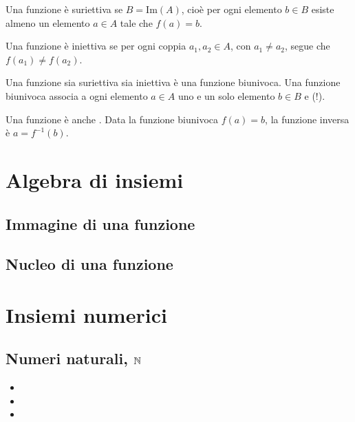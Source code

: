 \documentclass[letterpaper,10pt,italian]{jupyterBook}
\begin{document}
\sphinxAtStartPar
{} Una funzione è suriettiva se \(B = \text{Im}(A)\), cioè per ogni elemento \(b \in B\) esiste almeno un elemento \(a \in A\) tale che \(f(a) = b\).

\sphinxAtStartPar
{} Una funzione è iniettiva se per ogni coppia \(a_1, a_2 \in A\), con \(a_1 \ne a_2\), segue che \(f(a_1) \ne f(a_2)\).

\sphinxAtStartPar
{} Una funzione sia suriettiva sia iniettiva è una funzione biunivoca. Una funzione biunivoca associa a ogni elemento \(a \in A\) uno e un solo elemento \(b \in B\) e (!).

\sphinxAtStartPar
Una funzione  è anche . Data la funzione biunivoca \(f(a) = b\), la funzione inversa è \(a = f^{-1}(b)\).


\section{Algebra di insiemi}
\label{\detokenize{ch/set:algebra-di-insiemi}}\label{\detokenize{ch/set:math-hs-set-algebra}}

\subsection{Immagine di una funzione}
\label{\detokenize{ch/set:immagine-di-una-funzione}}\label{\detokenize{ch/set:math-hs-fun-range}}

\subsection{Nucleo di una funzione}
\label{\detokenize{ch/set:nucleo-di-una-funzione}}\label{\detokenize{ch/set:math-hs-fun-null}}

\section{Insiemi numerici}
\label{\detokenize{ch/set:insiemi-numerici}}\label{\detokenize{ch/set:math-hs-set-numbers}}

\subsection{Numeri naturali, \protect\(\mathbb{N}\protect\)}
\label{\detokenize{ch/set:numeri-naturali-mathbb-n}}\label{\detokenize{ch/set:math-hs-set-numbers-n}}\begin{itemize}
\item {} 
\sphinxAtStartPar
{}

\item {} 
\sphinxAtStartPar
{}

\item {} 
\sphinxAtStartPar
{}

\end{itemize}
\end{document}
